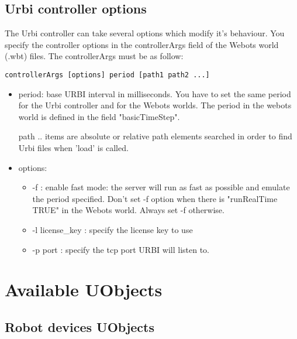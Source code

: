 \subsection{Urbi controller options}
\label{webots.own.controlleroptions}%

 The Urbi controller can take several options which modify it's behaviour.
You specify the controller options in the controllerArgs field of the Webots
world (.wbt) files.
 The controllerArgs must be as follow:

\begin{lstlisting}[firstnumber=1,]
controllerArgs [options] period [path1 path2 ...]
\end{lstlisting}
\begin{itemize}

\item period: base URBI interval in milliseconds. You have to set the
  same period for the Urbi controller and for the Webots worlds. The
  period in the webots world is defined in the field "basicTimeStep".


\item [path ..] items are absolute or relative path elements searched
  in order to find Urbi files when 'load' is called.


\item options:
  \begin{itemize}

  \item -{}f : enable fast mode: the server will run as fast as
    possible and emulate the period specified.  Don't set -{}f option
    when there is "runRealTime TRUE" in the Webots world.  Always set
    -{}f otherwise.


  \item -{}l license\_key : specify the license key to use


  \item -{}p port : specify the tcp port URBI will listen to.

  \end{itemize}

\end{itemize}



\section{Available UObjects}
\label{webots.uobjects}%

\subsection{Robot devices UObjects}
\label{webots.uobjects.robotdevices}%

